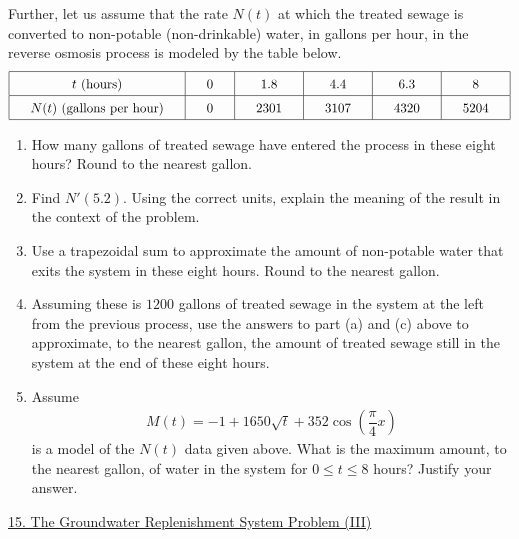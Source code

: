 Further, let us assume that the rate $N(t)$ at which the treated sewage is converted to non-potable (non-drinkable) water, in gallons per hour, in the reverse osmosis process is modeled by the table below. \begin{align*}
    \arraycolsep=16.5pt\def\arraystretch{1.5}
    \begin{array}{|c|c|c|c|c|c|}
        \hline
        t \text{ (hours)} & 0 & 1.8 & 4.4 & 6.3 & 8 \\ \hline
        N(t) \text{ (gallons per hour)} & 0 & 2301 & 3107 & 4320 & 5204 \\
        \hline
    \end{array} 
\end{align*}
\begin{enumerate}[label=\hspace{11pt}(\alph*), align=left, leftmargin=*, labelsep=0.25em]
    \item How many gallons of treated sewage have entered the process in these eight hours? Round to the nearest gallon.
    \item Find $N'(5.2)$. Using the correct units, explain the meaning of the result in the context of the problem.
    \item Use a trapezoidal sum to approximate the amount of non-potable water that exits the system in these eight hours. Round to the nearest gallon.
    \item Assuming these is $1200$ gallons of treated sewage in the system at the left from the previous process, use the answers to part (a) and (c) above to approximate, to the nearest gallon, the amount of treated sewage still in the system at the end of these eight hours.
    \item Assume \begin{align*}
        M(t) = -1 + 1650\sqrt{t} + 352\cos \left(\dfrac{\pi}{4}x\right)
    \end{align*}
    is a model of the $N(t)$ data given above. What is the maximum amount, to the nearest gallon, of water in the system for $0 \leq t \leq 8$ hours? Justify your answer.
\end{enumerate} \vspace{11pt}

\begin{center}
    \underline{15. The Groundwater Replenishment System Problem (III)}
\end{center}

